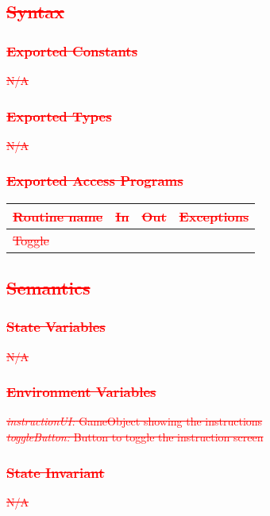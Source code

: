 \documentclass[12pt]{article}
\begin{document}
\subsection{\textcolor{red}{\sout{Syntax}}}
\subsubsection{\textcolor{red}{\sout{Exported Constants}}}
\textcolor{red}{\sout{N/A}}
\subsubsection{\textcolor{red}{\sout{Exported Types}}}
\textcolor{red}{\sout{N/A}}
\subsubsection{\textcolor{red}{\sout{Exported Access Programs}}}
\begin{tabular}{| l | l | l | l |}
\hline
\textcolor{red}{\sout{\textbf{Routine name}}} & \textcolor{red}{\sout{\textbf{In}}} & \textcolor{red}{\sout{\textbf{Out}}} & \textcolor{red}{\sout{\textbf{Exceptions}}}\\
\hline
\textcolor{red}{\sout{Toggle}}   &     &           &          \\
\hline
\end{tabular}

\subsection{\textcolor{red}{\sout{Semantics}}}
\subsubsection{\textcolor{red}{\sout{State Variables}}}
\textcolor{red}{\sout{N/A}}

\subsubsection{\textcolor{red}{\sout{Environment Variables}}}
\textcolor{red}{\sout{\textit{instructionUI:} GameObject showing the instructions}}\\
\textcolor{red}{\sout{\textit{toggleButton:} Button to toggle the instruction screen}}

\subsubsection{\textcolor{red}{\sout{State Invariant}}}
\textcolor{red}{\sout{N/A}}
\end{document}
